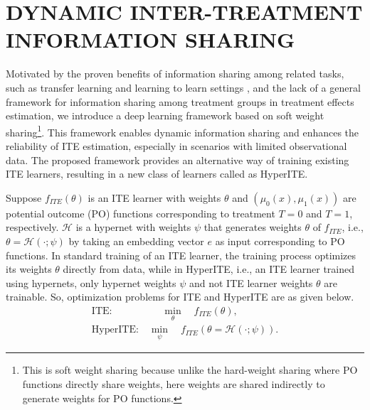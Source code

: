 \documentclass{article}
\begin{document}
\section{DYNAMIC INTER-TREATMENT INFORMATION SHARING}
\label{sec_hyper_cate}
Motivated by the proven benefits of information sharing among related tasks, such as transfer learning \cite{aloui2023transfer} and learning to learn settings \cite{maurer2016benefit}, and the lack of a general framework for information sharing among treatment groups in treatment effects estimation, we introduce a deep learning framework based on soft weight sharing\footnote{This is soft weight sharing because unlike the hard-weight sharing where PO functions directly share weights, here weights are shared indirectly to generate weights for PO functions.}. This framework enables dynamic information sharing and enhances the reliability of ITE estimation, especially in scenarios with limited observational data. The proposed framework provides an alternative way of training existing ITE learners, resulting in a new class of learners called as HyperITE.

Suppose $f_{ITE}(\theta)$ is an ITE learner with weights $\theta$ and $(\mu_0(x), \mu_1(x))$ are potential outcome (PO) functions corresponding to treatment $T=0$ and $T=1$, respectively. $\mathcal{H}$ is a hypernet with weights $\psi$ that generates weights $\theta$ of $f_{ITE}$, i.e., $\theta = \mathcal{H}(\cdot;\psi)$ by taking an embedding vector $e$ as input corresponding to PO functions. In standard training of an ITE learner, the training process optimizes its weights $\theta$ directly from data, while in HyperITE, i.e., an ITE learner trained using hypernets, only hypernet weights $\psi$ and not ITE learner weights $\theta$ are trainable. So, optimization problems for ITE and HyperITE are as given below.
\begin{equation}
	\begin{array}{l}
		\text{ITE:} \quad \quad \quad \quad \quad \min_{\theta}\quad f_{ITE}(\theta), \\ 
		\text{HyperITE:} \quad \min_{\psi}\quad f_{ITE}(\theta=\mathcal{H}(\cdot;\psi)).
	\end{array}
\end{equation}

\end{document}
